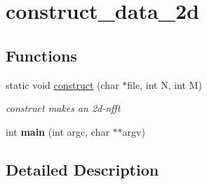 \hypertarget{group__applications__mri2d__construct__data__2d}{\section{construct\-\_\-data\-\_\-2d}
\label{group__applications__mri2d__construct__data__2d}
}
\subsection*{Functions}
\begin{DoxyCompactItemize}
\item 
\hypertarget{group__applications__mri2d__construct__data__2d_ga7cad9b408cf07cdd4fa31da9c325dac5}{static void \hyperlink{group__applications__mri2d__construct__data__2d_ga7cad9b408cf07cdd4fa31da9c325dac5}{construct} (char $\ast$file, int N, int M)}\label{group__applications__mri2d__construct__data__2d_ga7cad9b408cf07cdd4fa31da9c325dac5}

\begin{DoxyCompactList}\small\item\em construct makes an 2d-\/nfft \end{DoxyCompactList}\item 
\hypertarget{group__applications__mri2d__construct__data__2d_ga3c04138a5bfe5d72780bb7e82a18e627}{int {\bfseries main} (int argc, char $\ast$$\ast$argv)}\label{group__applications__mri2d__construct__data__2d_ga3c04138a5bfe5d72780bb7e82a18e627}

\end{DoxyCompactItemize}


\subsection{Detailed Description}
